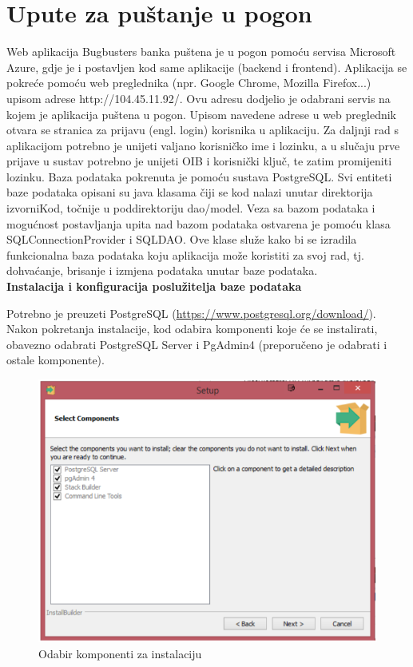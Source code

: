 		\section{Upute za puštanje u pogon}
		Web aplikacija Bugbusters banka puštena je u pogon pomoću servisa Microsoft Azure, gdje je i postavljen kod same aplikacije (backend i frontend). Aplikacija se pokreće pomoću web preglednika (npr. Google Chrome, Mozilla Firefox...) upisom adrese http://104.45.11.92/. Ovu adresu dodjelio je odabrani servis na kojem je aplikacija puštena u pogon. Upisom navedene adrese u web preglednik otvara se stranica za prijavu (engl. login) korisnika u aplikaciju. Za daljnji rad s aplikacijom potrebno je unijeti valjano korisničko ime i lozinku, a u slučaju prve prijave u sustav potrebno je unijeti OIB i korisnički ključ, te zatim promijeniti lozinku. Baza podataka pokrenuta je pomoću sustava PostgreSQL. Svi entiteti baze podataka opisani su java klasama čiji se kod nalazi unutar direktorija izvorniKod, točnije u poddirektoriju dao/model. Veza sa bazom podataka i mogućnost postavljanja upita nad bazom podataka ostvarena je pomoću klasa SQLConnectionProvider i SQLDAO. Ove klase služe kako bi se izradila funkcionalna baza podataka koju aplikacija može koristiti za svoj rad, tj. dohvaćanje, brisanje i izmjena podataka unutar baze podataka.\\
		
	 \textbf{Instalacija i konfiguracija poslužitelja baze podataka}
		
			Potrebno je preuzeti PostgreSQL (\underline{\url{https://www.postgresql.org/download/}}). Nakon pokretanja instalacije, kod odabira komponenti koje će se instalirati, obavezno odabrati PostgreSQL Server i PgAdmin4 (preporučeno je odabrati i ostale komponente).
			
			\begin{figure}[H]
				\includegraphics[scale=0.65]{Slike/Instalacija.png}
				\centering
				\caption{Odabir komponenti za instalaciju}
				\label{fig:dijagram}
			\end{figure}
			
